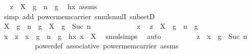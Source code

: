 \begin{isabellebody}
\ \isamarkupfalse%
\ {\isachardoublequoteopen}z\ {\isasymin}\ {\isacharparenleft}{\kern0pt}X\ {\isasymcdots}\ {\isacharbraceleft}{\kern0pt}g\ {\isacharcircum}{\kern0pt}\ n{\isacharbraceright}{\kern0pt}{\isacharparenright}{\kern0pt}\ {\isasymcdots}\ {\isacharbraceleft}{\kern0pt}g{\isacharbraceright}{\kern0pt}{\isachardoublequoteclose}\ \isamarkupfalse%
\ hx\ assms\ \isanewline
\ \ \ \ \ \ \ \ \isamarkupfalse%
\ {\isacharparenleft}{\kern0pt}simp\ add{\isacharcolon}{\kern0pt}\ power{\isacharunderscore}{\kern0pt}mem{\isacharunderscore}{\kern0pt}carrier\ smul{\isachardot}{\kern0pt}smulI\ subsetD{\isacharparenright}{\kern0pt}\isanewline
\ \ \ \ \isamarkupfalse%
\isanewline
\ \ \isamarkupfalse%
\isanewline
\ \ \ \ \isamarkupfalse%
\ {\isachardoublequoteopen}{\isacharparenleft}{\kern0pt}X\ {\isasymcdots}\ {\isacharbraceleft}{\kern0pt}g\ {\isacharcircum}{\kern0pt}\ n{\isacharbraceright}{\kern0pt}{\isacharparenright}{\kern0pt}\ {\isasymcdots}\ {\isacharbraceleft}{\kern0pt}g{\isacharbraceright}{\kern0pt}\ {\isasymsubseteq}\ X\ {\isasymcdots}\ {\isacharbraceleft}{\kern0pt}g\ {\isacharcircum}{\kern0pt}\ Suc\ n{\isacharbraceright}{\kern0pt}{\isachardoublequoteclose}\isanewline
\ \ \ \ \isamarkupfalse%
\isanewline
\ \ \ \ \ \ \isamarkupfalse%
\ z\ \isamarkupfalse%
\ {\isachardoublequoteopen}z\ {\isasymin}\ {\isacharparenleft}{\kern0pt}X\ {\isasymcdots}\ {\isacharbraceleft}{\kern0pt}g\ {\isacharcircum}{\kern0pt}\ n{\isacharbraceright}{\kern0pt}{\isacharparenright}{\kern0pt}\ {\isasymcdots}\ {\isacharbraceleft}{\kern0pt}g{\isacharbraceright}{\kern0pt}{\isachardoublequoteclose}\isanewline
\ \ \ \ \ \ \isamarkupfalse%
\ \isamarkupfalse%
\ x\ \ {\isachardoublequoteopen}z\ {\isacharequal}{\kern0pt}\ {\isacharparenleft}{\kern0pt}x\ {\isasymcdot}\ g\ {\isacharcircum}{\kern0pt}\ n{\isacharparenright}{\kern0pt}\ {\isasymcdot}\ g{\isachardoublequoteclose}\ \ hx{\isacharcolon}{\kern0pt}\ {\isachardoublequoteopen}x\ {\isasymin}\ X{\isachardoublequoteclose}\ \isamarkupfalse%
\ smul{\isachardot}{\kern0pt}simps\ \isamarkupfalse%
\ auto\isanewline
\ \ \ \ \ \ \isamarkupfalse%
\ \isamarkupfalse%
\ {\isachardoublequoteopen}z\ {\isacharequal}{\kern0pt}\ x\ {\isasymcdot}\ g\ {\isacharcircum}{\kern0pt}\ Suc\ n{\isachardoublequoteclose}\ \isanewline
\ \ \ \ \ \ \ \ \isamarkupfalse%
\ power{\isacharunderscore}{\kern0pt}def\ associative\ power{\isacharunderscore}{\kern0pt}mem{\isacharunderscore}{\kern0pt}carrier\ assms\ \isamarkupfalse%

\end{isabellebody}
